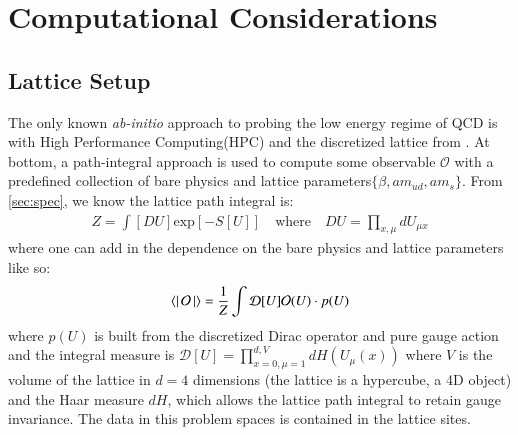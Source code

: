 \chapter{Computational Considerations}
\label{sec:comp}
\section{Lattice Setup}
The only known \textit{ab-initio} approach to probing the low energy regime of QCD is with High Performance Computing(HPC) and the discretized lattice from . At bottom, a path-integral approach is used to compute some observable $\mathcal{O}$ with a predefined collection of bare physics and lattice parameters$\{\beta,am_{ud},am_s\}$. From \ref{sec:spec}, we know the lattice path integral is:
\begin{align}
  Z = \int [DU] \text{exp}\left[-S[U]\right] \quad \text{where} \quad  DU = \prod_{x,\mu}^{} dU_{\mu x}
\end{align} where one can add in the dependence on the bare physics and lattice parameters like so: 
\begin{equation}
  \bra{}\mathcal{O}\ket{} = \frac{1}{Z} \int \mathcal{D}[U] \mathcal{O}(U) \cdot p(U)
\end{equation} where $p(U)$ is built from the discretized Dirac operator and pure gauge action and the integral measure is $\mathcal{D}[U] = \prod_{x=0,\mu=1}^{d,V} dH(U_\mu(x))$ where $V$ is the volume of the lattice in $d=4$ dimensions (the lattice is a hypercube, a 4D object) and the Haar measure $dH$, which allows the lattice path integral to retain gauge invariance. The data in this problem spaces is contained in the lattice sites. 

